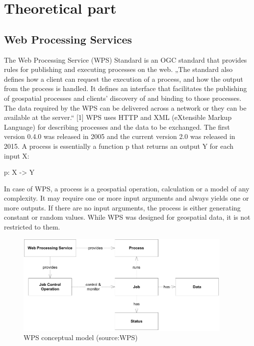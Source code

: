 \chapter{Theoretical part}
\label{2-teorie}




\section{Web Processing Services}

The Web Processing Service (WPS) Standard is an OGC standard that provides rules for publishing and executing processes on the web. „The standard also defines how a client can request the execution of a process, and how the output from the process is handled. It defines an interface that facilitates the publishing of geospatial processes and clients’ discovery of and binding to those processes. The data required by the WPS can be delivered across a network or they can be available at the server.“ [1] WPS uses HTTP and XML (eXtensible Markup Language) for describing processes and the data to be exchanged. The first version 0.4.0 was released in 2005 and the current version 2.0 was released in 2015.
A process is essentially a function p that returns an output Y for each input X:\\
\centerline{p: X -> Y}
In case of WPS, a process is a geospatial operation, calculation or a model of any complexity. It may require one or more input arguments and always yields one or more outputs. If there are no input arguments, the process is either generating constant or random values. While WPS was designed for geospatial data, it is not restricted to them.



\begin{figure}[H] \centering
      \includegraphics[width=300pt]{./pictures/wps_conceptual_model.png}
      \caption[QGIS logo]{WPS conceptual model (source:WPS)}
      \label{fig:WPS}
  \end{figure}


